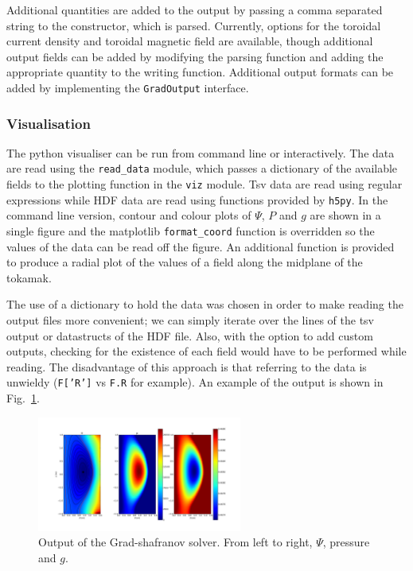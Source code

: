 \documentclass[paper=letter, fontsize=11pt]{scrartcl} %
\begin{document}
Additional quantities are added to the output by passing a comma separated string to the constructor, which is parsed. Currently, options for the toroidal current density and toroidal magnetic field are available, though additional output fields can be added by modifying the parsing function and adding the appropriate quantity to the writing function. Additional output formats can be added by implementing the \texttt{GradOutput} interface.

\subsubsection{Visualisation}

The python visualiser can be run from command line or interactively. The data are read using the \texttt{read\_data} module, which passes a dictionary of the available fields to the plotting function in the \texttt{viz} module. Tsv data are read using regular expressions while HDF data are read using functions provided by \texttt{h5py}. In the command line version, contour and colour plots of $\Psi$, $P$ and $g$ are shown in a single figure and the matplotlib \texttt{format\_coord} function is overridden so the values of the data can be read off the figure. An additional function is provided to produce a radial plot of the values of a field along the midplane of the tokamak. 

The use of a dictionary to hold the data was chosen in order to make reading the output files more convenient; we can simply iterate over the lines of the tsv output or datastructs of the HDF file. Also, with the option to add custom outputs, checking for the existence of each field would have to be performed while reading. The disadvantage of this approach is that referring to the data is unwieldy (\texttt{F['R']} vs \texttt{F.R} for example). An example of the output is shown in Fig.~\ref{fig:eqm}.

\begin{figure}
	\centering
	\includegraphics[width=0.6\textwidth]{eqm}
	\caption{Output of the Grad-shafranov solver. From left to right, $\Psi$, pressure and $g$. }
	\label{fig:eqm}
\end{figure}
\end{document}
